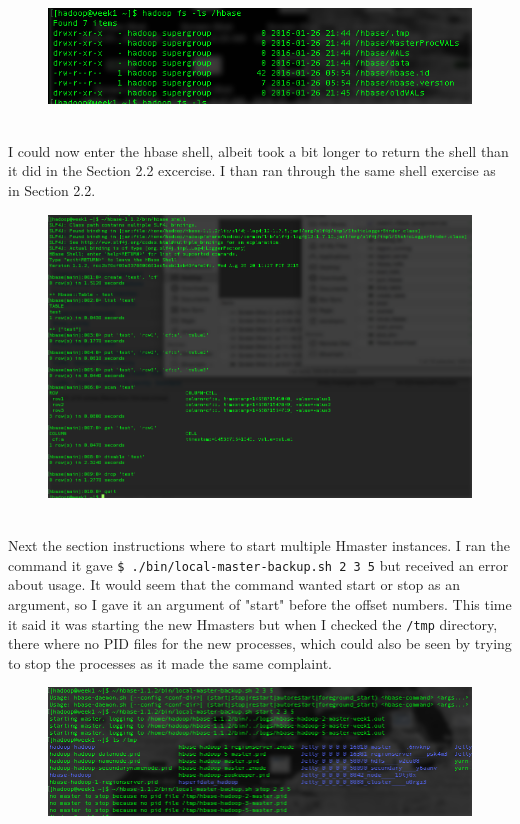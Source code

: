 \documentclass[10pt]{article}
\begin{document}
\begin{figure}[!h]
\includegraphics[scale=0.40]{hdfs_working.png}
\centering
\end{figure}\\
I could now enter the hbase shell, albeit took a bit longer to return the shell than it did in the Section 2.2 excercise. I than ran through the same shell exercise as in Section 2.2.
\begin{figure}[!h]
\includegraphics[scale=0.37]{shell_exercise2.png}
\centering
\end{figure}\\
\indent Next the section instructions where to start multiple Hmaster instances. I ran the command it gave \verb|$ ./bin/local-master-backup.sh 2 3 5| but received an error about usage. It would seem that the command wanted start or stop as an argument, so I gave it an argument of "start" before the offset numbers. This time it said it was starting the new Hmasters but when I checked the \verb|/tmp| directory, there where no PID files for the new processes, which could also be seen by trying to stop the processes as it made the same complaint.
\pagebreak
\begin{figure}[!h]
\includegraphics[scale=0.37]{nostart_hmaster.png}
\centering
\end{figure}\\
\end{document}
